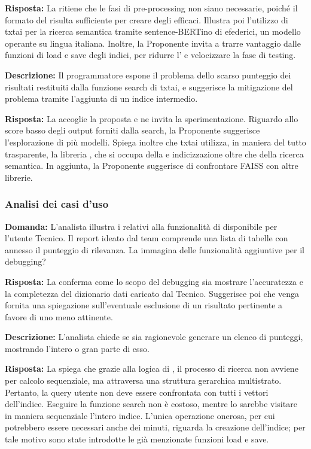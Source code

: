 \textbf{Risposta:} La  ritiene che le fasi di pre-processing non siano necessarie, poiché il formato del  risulta sufficiente per creare degli  efficaci.
Illustra poi l'utilizzo di txtai per la ricerca semantica tramite sentence-BERTino di efederici, un modello operante su lingua italiana. Inoltre, la Proponente invita a trarre vantaggio dalle funzioni di load e save degli indici, per ridurre l' e velocizzare la fase di testing.

\textbf{Descrizione:} Il programmatore espone il problema dello scarso punteggio dei risultati restituiti dalla funzione search di txtai, e suggerisce la mitigazione del problema tramite l'aggiunta di un indice intermedio. 

\textbf{Risposta:} La  accoglie la proposta e ne invita la sperimentazione. 
Riguardo allo score basso degli output forniti dalla search, la Proponente suggerisce l'esplorazione di più modelli. 
Spiega inoltre che txtai utilizza, in maniera del tutto trasparente, la libreria , che si occupa della  e indicizzazione oltre che della ricerca semantica. In aggiunta, la Proponente suggerisce di confrontare FAISS con altre librerie.

\subsubsection{Analisi dei casi d'uso}

\textbf{Domanda:} L'analista illustra i  relativi alla funzionalità di  disponibile per l'utente Tecnico. Il report ideato dal team comprende una lista di tabelle con annesso il punteggio di rilevanza. 
La  immagina delle funzionalità aggiuntive per il debugging?

\textbf{Risposta:} La  conferma come lo scopo del debugging sia mostrare l'accuratezza e la completezza del dizionario dati caricato dal Tecnico. 
Suggerisce poi che venga fornita una spiegazione sull'eventuale esclusione di un risultato pertinente a favore di uno meno attinente.

\textbf{Descrizione:} L'analista chiede se sia ragionevole generare un elenco di punteggi, mostrando l'intero  o gran parte di esso.

\textbf{Risposta:} La  spiega che grazie alla logica di , il processo di ricerca non avviene per calcolo sequenziale, ma attraversa una struttura gerarchica multistrato. Pertanto, la query utente non deve essere confrontata con tutti i vettori dell'indice. 
Eseguire la funzione search non è costoso, mentre lo sarebbe visitare in maniera sequenziale l'intero indice. 
L'unica operazione onerosa, per cui potrebbero essere necessari anche dei minuti, riguarda la creazione dell'indice; per tale motivo sono state introdotte le già menzionate funzioni load e save.

